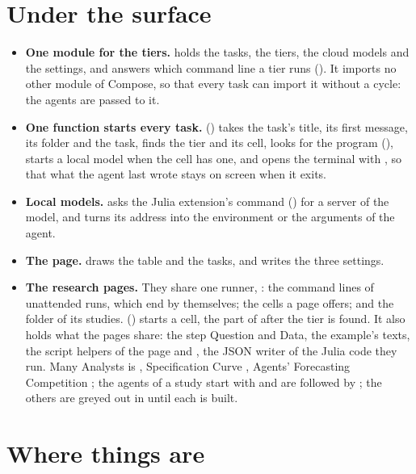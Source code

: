 \section{Under the surface}\label{sec:machinery}
\begin{itemize}
  \item \textbf{One module for the tiers.}  holds the tasks, the tiers, the cloud models and the
    settings, and answers which command line a tier runs (). It imports no other module of Compose, so
    that every task can import it without a cycle: the agents are passed to it.
  \item \textbf{One function starts every task.}  () takes the task's title,
    its first message, its folder and the task, finds the tier and its cell, looks for the program
    (), starts a local model when the cell has one, and opens the terminal with
    , so that what the agent last wrote stays on screen when it exits.
  \item \textbf{Local models.}  asks the Julia extension's command
     () for a server of the model, and turns its
    address into the environment or the arguments of the agent.
  \item \textbf{The page.}  draws the table and the tasks, and writes the three settings.
  \item \textbf{The research pages.} They share one runner, : the command lines of unattended
    runs, which end by themselves; the cells a page offers; and the folder of its studies. 
    () starts a cell, the part of  after the tier is found. It also holds what
    the pages share: the step Question and Data, the example's texts, the script helpers of the page and
    , the JSON writer of the Julia code they run. Many Analysts is ,
    Specification Curve , Agents' Forecasting Competition ;
    the agents of a study start with  and are followed by ; the others are greyed out in 
    until each is built.
\end{itemize}

\section{Where things are}

